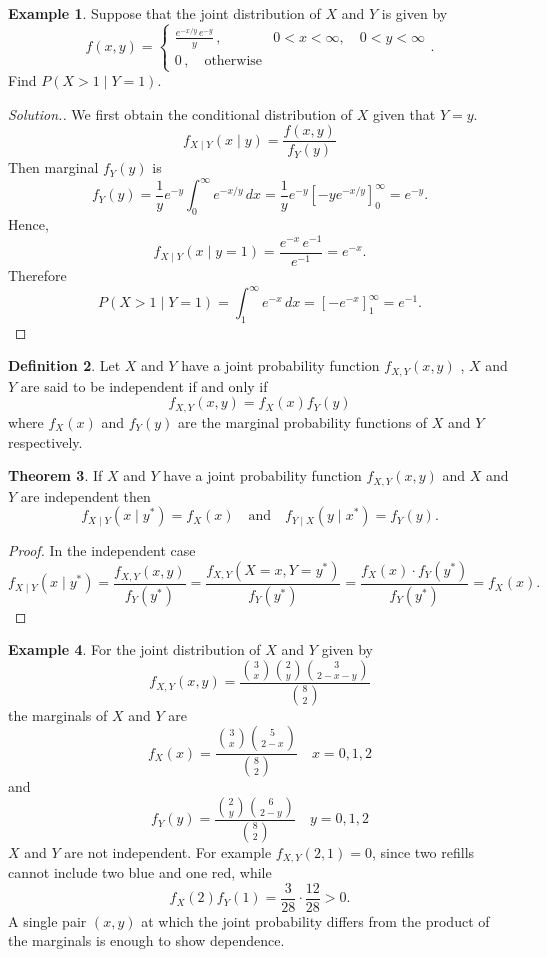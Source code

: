\documentclass[12pt,a4paper]{report}
\theoremstyle{definition}
\newtheorem{thm}{Theorem}[section]
\newtheorem{definition}[thm]{Definition}
\newtheorem{example}[thm]{Example}
\theoremstyle{plain}
\theoremstyle{definition}
\begin{document}
\begin{example}
Suppose that the joint distribution of $X$ and $Y$ is given by \[f(x,y) = \begin{cases}
\frac{e^{-x/y}\,e^{-y}}{y}\, , & 0 < x < \infty, \quad 0  < y < \infty\\
0\,, \quad \text{otherwise}
\end{cases}.\]
Find $P(X > 1\mid Y = 1)$.
\end{example}

\begin{proof}[\textit{Solution.}]
We first obtain the conditional distribution of $X$ given that $Y = y$.
\[f_{X\mid Y}(x\mid y) = \frac{f(x,y)}{f_Y(y)}\]
Then marginal $f_Y(y)$ is 
\[f_Y(y) = \frac{1}{y}e^{-y}\int^{\infty}_0 e^{-x/y}\, dx = \frac{1}{y}e^{-y}\left[-ye^{-x/y}\right]^{\infty}_0 = e^{-y}.\]
Hence, \[f_{X\mid Y}(x\mid y = 1) = \frac{e^{-x}\, e^{-1}}{e^{-1}} = e^{-x}.\]
Therefore
\[P(X > 1\mid Y = 1) = \int^{\infty}_1e^{-x}\, dx = \left[-e^{-x}\right]^{\infty}_1 = e^{-1}.\]
\end{proof}



\begin{definition}
Let $X$ and $Y$ have a joint probability function $f_{X,Y}(x,y)$ , $X$ and $Y$ are said to be independent if and only if \[f_{X,Y}(x,y)=f_X(x)f_Y(y)\] where $f_X(x)$ and $f_Y(y)$ are the marginal probability functions of $X$ and $Y$ respectively.
\end{definition}



\begin{thm}
If $X$ and $Y$ have a joint probability function $f_{X,Y}(x,y)$ and $X$ and $Y$ are independent then
\[f_{X\mid Y}(x\mid y^*)=f_X(x)\quad \text{and}\quad f_{Y\mid X}(y\mid x^*)=f_Y(y).\]
\end{thm}




\begin{proof}
In the  independent case
\[f_{X\mid Y}(x\mid y^*)  = \frac{f_{X,Y}(x,y)}{f_Y(y^*)}=\frac{f_{X,Y}(X=x,Y=y^*)}{f_Y(y^*)} = \frac{f_X(x)\cdot f_Y(y^*)}{f_Y(y^*)} = f_X(x).\]
\end{proof}


\begin{example}
For the joint distribution of $X$ and $Y$ given by 
\[f_{X,Y}(x,y)=\frac{\binom{3}{x}\binom{2}{y}\binom{3}{2-x-y}}{\binom{8}{2}}\]
the marginals of $X$ and $Y$ are 
\[f_X(x)=\frac{\binom{3}{x}\binom{5}{2-x}}{\binom{8}{2}}\quad x=0,1,2\]
and
\[f_Y(y)=\frac{\binom{2}{y}\binom{6}{2-y}}{\binom{8}{2}}\quad y=0,1,2\]
$X$ and $Y$ are not independent. For example $f_{X,Y}(2,1) = 0$, since two refills cannot include two blue and one red, while
\[f_X(2)f_Y(1) = \frac{3}{28}\cdot\frac{12}{28}>0 .\]
A single pair $(x, y)$ at which the joint probability differs from the product of the marginals is enough to show dependence.
\end{example}
\end{document}
